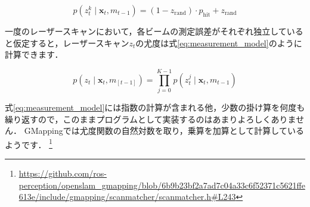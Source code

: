 \documentclass[{../../master}]{subfiles}
\begin{document}
\begin{equation}
  p(z_{t}^{k} \mid \bm{x}_{t}, m_{t-1}) = (1 - z_{\text{rand}}) \cdot p_{\text{hit}} + z_{\text{rand}}
  \label{eq:beam_likelihood_im_gmapping}
\end{equation}

一度のレーザースキャンにおいて，各ビームの測定誤差がそれぞれ独立していると仮定すると，レーザースキャン$z_{t}$の尤度は式\ref{eq:measurement_model}のように計算できます．

\begin{equation}
  p(z_{t} \mid \bm{x}_{t}, m_[t-1]) = \prod_{j=0}^{K-1} p(z_{t}^{j} \mid \bm{x}_{t}, m_{t-1})
  \label{eq:measurement_model}
\end{equation}

式\ref{eq:measurement_model}には指数の計算が含まれる他，少数の掛け算を何度も繰り返すので，このままプログラムとして実装するのはあまりよろしくありません．
GMappingでは尤度関数の自然対数を取り，乗算を加算として計算しているようです．
\footnote{\url{https://github.com/ros-perception/openslam_gmapping/blob/6b9b23bf2a7ad7c04a33c6f52371c5621ffe613e/include/gmapping/scanmatcher/scanmatcher.h\#L243}}
\end{document}
